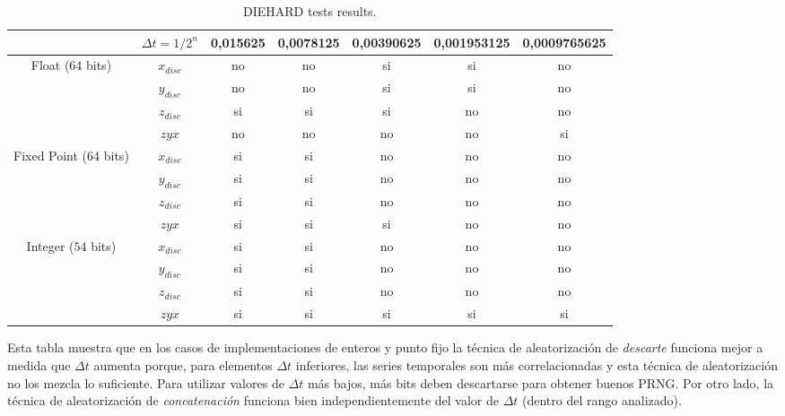 \begin{table*} [tb]
\begin{center}
\caption{DIEHARD tests results.}
\begin{tabular}{|c|c|c|c|c|c|c|}
	\hline\hline
	                        & $\Delta t=1/2^n$ & 0,015625 & 0,0078125 & 0,00390625 & 0,001953125 & 0,0009765625 \\ \hline\hline
	   Float ($64$ bits)    &    $x_{disc}$    &    no    &    no     &     si     &     si      &      no      \\ \hline
	                        &    $y_{disc}$    &    no    &    no     &     si     &     si      &      no      \\ \hline
	                        &    $z_{disc}$    &    si    &    si     &     si     &     no      &      no      \\ \hline
	                        &      $zyx$       &    no    &    no     &     no     &     no      &      si      \\ \hline\hline
	Fixed Point ($64$ bits) &    $x_{disc}$    &    si    &    si     &     no     &     no      &      no      \\ \hline
	                        &    $y_{disc}$    &    si    &    si     &     no     &     no      &      no      \\ \hline
	                        &    $z_{disc}$    &    si    &    si     &     no     &     no      &      no      \\ \hline
	                        &      $zyx$       &    si    &    si     &     si     &     no      &      no      \\ \hline\hline
	  Integer ($54$ bits)   &    $x_{disc}$    &    si    &    si     &     no     &     no      &      no      \\ \hline
	                        &    $y_{disc}$    &    si    &    si     &     no     &     no      &      no      \\ \hline
	                        &    $z_{disc}$    &    si    &    si     &     no     &     no      &      no      \\ \hline
	                        &      $zyx$       &    si    &    si     &     si     &     si      &      si      \\ \hline
\end{tabular}\end{center}
\label{tabla:Tabla2}
\end{table*}

Esta tabla muestra que en los casos de implementaciones de enteros y punto fijo la técnica de aleatorización de \textit{descarte} funciona mejor a medida que $\Delta t$ aumenta porque, para elementos $\Delta t$ inferiores, las series temporales son más correlacionadas y esta técnica de aleatorización no los mezcla lo suficiente.
Para utilizar valores de $\Delta t$ más bajos, más bits deben descartarse para obtener buenos PRNG.
Por otro lado, la técnica de aleatorización de \textit{concatenación} funciona bien independientemente del valor de $\Delta t$ (dentro del rango analizado).

